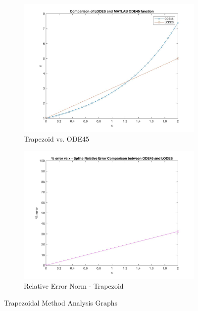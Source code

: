 \documentclass[12pt, titlepage]{article}
\begin{document}
\begin{figure}[H]
\centering
\begin{subfigure}{.55\textwidth}
  \centering
  \includegraphics[width=\linewidth]{images/Test1/2LODESvsMATLABPlot.jpg}
  \caption{Trapezoid vs. ODE45}
  \label{fig:trap1a}
\end{subfigure}%
\begin{subfigure}{.55\textwidth}
  \centering
  \includegraphics[width=\linewidth]{images/Test1/2RelativeErrorPlot.jpg}
  \caption{Relative Error Norm - Trapezoid}
  \label{fig:trap1b}
\end{subfigure}
\caption{Trapezoidal Method Analysis Graphs}
\label{fig:trap1}
\end{figure}
\end{document}
